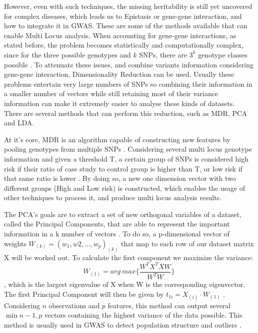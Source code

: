 However, even with such techniques, the missing heritability is still yet uncovered for complex diseases, which leads us to Epistasis or gene-gene interaction, and how to integrate it in \gls{GWAS}. These are some of the methods available that can enable Multi Locus analysis. When accounting for gene-gene interactions, as stated before, the problem becomes statistically and computationally complex, since for the three possible genotypes and $k$ \gls{SNP}s, there are $3^k$ genotype classes possible \cite{winham2013applications}. To attenuate these issues, and combine variants information considering gene-gene interaction, Dimensionality Reduction can be used. Usually these problems entertain very large numbers of \gls{SNP}s so combining their information in a smaller number of vectors while still retaining most of their variance information can make it extremely easier to analyse these kinds of datasets. There are several methods that can perform this reduction, such as \gls{MDR}, \gls{PCA} and \gls{LDA}.

 At it's core, \gls{MDR} is an algorithm capable of constructing new features by pooling genotypes from multiple \gls{SNP}s \cite{moore2006flexible}. Considering several multi locus genotype information and given a threshold T, a certain group of \gls{SNP}s is considered high risk if their ratio of case study to control group is higher than T, or low risk if that same ratio is lower \cite{moore2010bioinformatics}. By doing so, a new one dimension vector with two different groups (High and Low risk) is constructed, which enables the usage of other techniques to process it, and produce multi locus analysis results. 

The \gls{PCA}'s goals are to extract a set of new orthogonal variables of a dataset, called the Principal Components, that are able to represent the important information in a k number of vectors \cite{abraham2014fast}. To do so, a p-dimensional vector of weights $W_{(k)} = (w_1, w2, ..., w_p)_{(k)} $ that map to each row of our dataset matrix X will be worked out. To calculate the first component we maximize the variance: 
\begin{equation}
W_{(1)} = arg\  max \Big\{ \frac{W^T X^T XW}{W^T W} \Big\} 
\end{equation}
, which is the largest eigenvalue of X when W is the corresponding eigenvector. The first Principal Component will then be given by $t_{1i} = X_{(i)} \cdot W_{(1)}$ \cite{bro2014principal}. Considering $n$ observations and $p$ features, this method can output several $\min{n-1, p}$ vectors containing the highest variance of the data possible. This method is usually used in \gls{GWAS} to detect population structure and outliers \cite{price2006principal}.

